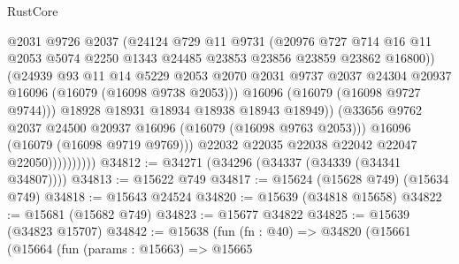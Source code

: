 \begin{lexlean}{RustCore}
\begin{coremodule}
                                @2031
                                @9726
                                @2037
                                (@24124
                                  @729
                                  @11
                                  @9731
                                  (@20976
                                    @727
                                    @714
                                    @16
                                    @11
                                    @2053
                                    @5074
                                    @2250
                                    @1343
                                    @24485
                                    @23853
                                    @23856
                                    @23859
                                    @23862
                                    @16800))
                                (@24939
                                  @93
                                  @11
                                  @14
                                  @5229
                                  @2053
                                  @2070
                                  @2031
                                  @9737
                                  @2037
                                  @24304
                                  @20937
                                  @16096
                                  (@16079 (@16098 @9738 @2053)))
                                @16096
                                (@16079 (@16098 @9727 @9744)))
                              @18928
                              @18931
                              @18934
                              @18938
                              @18943
                              @18949))
                          (@33656 @9762 @2037 @24500 @20937 @16096 (@16079 (@16098 @9763 @2053)))
                          @16096
                          (@16079 (@16098 @9719 @9769)))
                        @22032
                        @22035
                        @22038
                        @22042
                        @22047
                        @22050))))))))))
@34812 := @34271 (@34296 (@34337 (@34339 (@34341 @34807))))
@34813 := @15622 @749
@34817 := @15624 (@15628 @749) (@15634 @749)
@34818 := @15643 @24524
@34820 := @15639 (@34818 @15658)
@34822 := @15681 (@15682 @749)
@34823 := @15677 @34822
@34825 := @15639 (@34823 @15707)
@34842 := @15638
    (fun (fn : @40) =>
    @34820
      (@15661
        (@15664
          (fun (params : @15663) =>
          @15665

\end{coremodule}
\end{lexlean}
